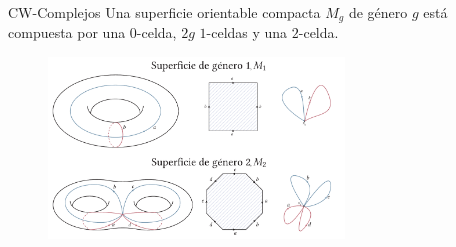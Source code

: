 \begin{frame}{CW-Complejos}
Una superficie orientable compacta $M_g$ de género $g$ está compuesta por una $0$-celda, $2g$ $1$-celdas y una $2$-celda.
\begin{figure}
\centering
\includegraphics[width = 0.7\textwidth]{images/supgeng}
\end{figure}
\end{frame}


